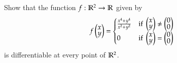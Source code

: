 Show that the function $f : \mathbb{R}^2 \to \mathbb{R}$ given by
\[f\Point{x \\ y} = \begin{cases} \frac{x^4+y^4}{x^2+y^2} & \text{if } \def\arraystretch{0.7}\Point{x \\ y}\neq \Point{0 \\ 0} \\
0 & \text{if } \def\arraystretch{0.7}\Point{x \\ y} = \Point{0 \\ 0}\end{cases}
\]
is differentiable at every point of $\mathbb{R}^2$.                                                                                                                                                                                                                                                                                                                                                                                                                                                                                                                                                                                                                                                                                                                                                                                                                                                                                                                                                                                                                                                                                                                                                                                                                                                                                                                                                                                                                                                                                                                                                                                                                                                                                                                                                                                                                                                                                                                                                                                                                                                                                                                                                                                                                                                                                                                                                                                                                                                                                                                                                                                                                                                                                                                                                     
